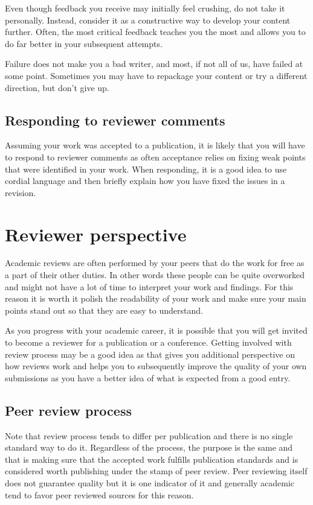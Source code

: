 Even though feedback you receive may initially feel crushing, do not take it personally.
Instead, consider it as a constructive way to develop your content further.
Often, the most critical feedback teaches you the most and allows you to do far better in your subsequent attempts.

Failure does not make you a bad writer, and most, if not all of us, have failed at some point.
Sometimes you may have to repackage your content or try a different direction, but don't give up.

\subsection{Responding to reviewer comments}

Assuming your work was accepted to a publication, it is likely that you will have to respond to reviewer comments as often acceptance relies on fixing weak points that were identified in your work.
When responding, it is a good idea to use cordial language and then briefly explain how you have fixed the issues in a revision.

\section{Reviewer perspective}

Academic reviews are often performed by your peers that do the work for free as a part of their other duties.
In other words these people can be quite overworked and might not have a lot of time to interpret your work and findings.
For this reason it is worth it polish the readability of your work and make sure your main points stand out so that they are easy to understand.

As you progress with your academic career, it is possible that you will get invited to become a reviewer for a publication or a conference.
Getting involved with review process may be a good idea as that gives you additional perspective on how reviews work and helps you to subsequently improve the quality of your own submissions as you have a better idea of what is expected from a good entry.

\subsection{Peer review process}

Note that review process tends to differ per publication and there is no single standard way to do it.
Regardless of the process, the purpose is the same and that is making sure that the accepted work fulfills publication standards and is considered worth publishing under the stamp of peer review.
Peer reviewing itself does not guarantee quality but it is one indicator of it and generally academic tend to favor peer reviewed sources for this reason.

